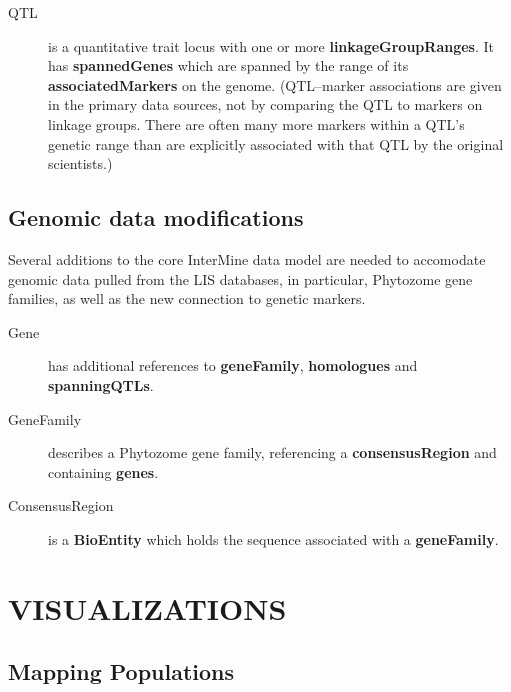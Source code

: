 \documentclass[]{pagposter}
\begin{document}
\begin{multicols*}{3}
\begin{description}
    \item[QTL] is a quantitative trait locus with one or more \textbf{linkageGroupRanges}. It has \textbf{spannedGenes} which are spanned by the range of its \textbf{associatedMarkers} on the genome.
      (QTL--marker associations are given in the primary data sources, not by comparing the QTL to markers on linkage groups. There are often many more markers within a QTL's genetic range than are explicitly
      associated with that QTL by the original scientists.)

  \end{description}

  \subsection*{Genomic data modifications}

  Several additions to the core InterMine data model are needed to accomodate genomic data pulled from the LIS databases, in particular,
  Phytozome gene families, as well as the new connection to genetic markers.

  \begin{description}

    \item[Gene] has additional references to \textbf{geneFamily}, \textbf{homologues} and \textbf{spanningQTLs}.

    \item[GeneFamily] describes a Phytozome gene family, referencing a \textbf{consensusRegion} and containing \textbf{genes}.

    \item[ConsensusRegion] is a \textbf{BioEntity} which holds the sequence associated with a \textbf{geneFamily}.

  \end{description}


  \section*{VISUALIZATIONS}

  \subsection*{Mapping Populations}


\end{multicols*}
\end{document}
